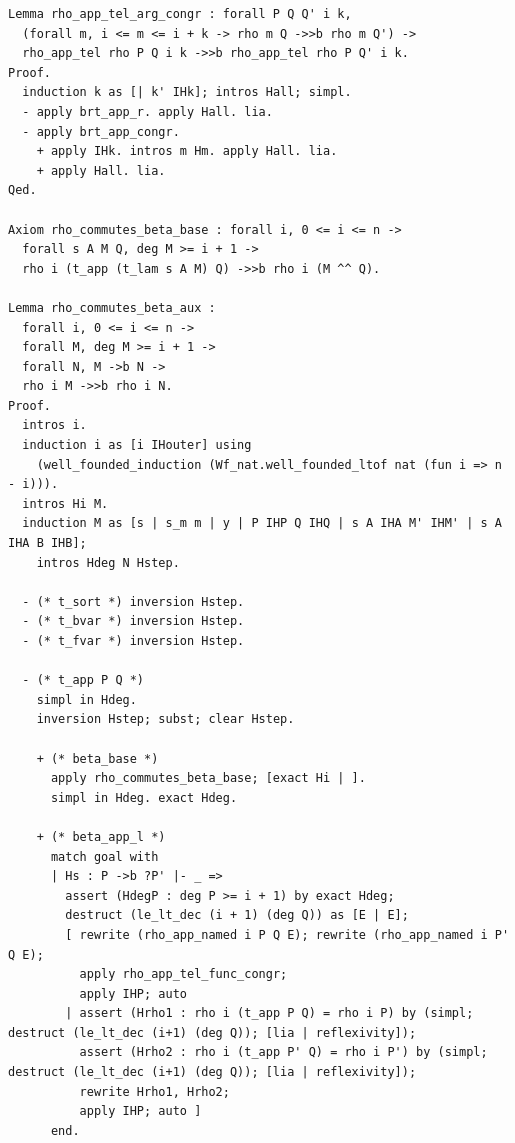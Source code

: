 \begin{latin}
\begin{verbatim}
Lemma rho_app_tel_arg_congr : forall P Q Q' i k,
  (forall m, i <= m <= i + k -> rho m Q ->>b rho m Q') ->
  rho_app_tel rho P Q i k ->>b rho_app_tel rho P Q' i k.
Proof.
  induction k as [| k' IHk]; intros Hall; simpl.
  - apply brt_app_r. apply Hall. lia.
  - apply brt_app_congr.
    + apply IHk. intros m Hm. apply Hall. lia.
    + apply Hall. lia.
Qed.

Axiom rho_commutes_beta_base : forall i, 0 <= i <= n ->
  forall s A M Q, deg M >= i + 1 ->
  rho i (t_app (t_lam s A M) Q) ->>b rho i (M ^^ Q).

Lemma rho_commutes_beta_aux :
  forall i, 0 <= i <= n ->
  forall M, deg M >= i + 1 ->
  forall N, M ->b N ->
  rho i M ->>b rho i N.
Proof.
  intros i.
  induction i as [i IHouter] using
    (well_founded_induction (Wf_nat.well_founded_ltof nat (fun i => n - i))).
  intros Hi M.
  induction M as [s | s_m m | y | P IHP Q IHQ | s A IHA M' IHM' | s A IHA B IHB];
    intros Hdeg N Hstep.

  - (* t_sort *) inversion Hstep.
  - (* t_bvar *) inversion Hstep.
  - (* t_fvar *) inversion Hstep.

  - (* t_app P Q *)
    simpl in Hdeg.
    inversion Hstep; subst; clear Hstep.

    + (* beta_base *)
      apply rho_commutes_beta_base; [exact Hi | ].
      simpl in Hdeg. exact Hdeg.

    + (* beta_app_l *)
      match goal with
      | Hs : P ->b ?P' |- _ =>
        assert (HdegP : deg P >= i + 1) by exact Hdeg;
        destruct (le_lt_dec (i + 1) (deg Q)) as [E | E];
        [ rewrite (rho_app_named i P Q E); rewrite (rho_app_named i P' Q E);
          apply rho_app_tel_func_congr;
          apply IHP; auto
        | assert (Hrho1 : rho i (t_app P Q) = rho i P) by (simpl; destruct (le_lt_dec (i+1) (deg Q)); [lia | reflexivity]);
          assert (Hrho2 : rho i (t_app P' Q) = rho i P') by (simpl; destruct (le_lt_dec (i+1) (deg Q)); [lia | reflexivity]);
          rewrite Hrho1, Hrho2;
          apply IHP; auto ]
      end.


\end{verbatim}
\end{latin}
